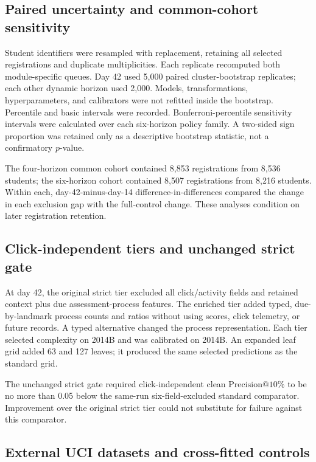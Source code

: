 \documentclass[11pt]{article}
\makeatletter
\newcommand{\Pten}{\ensuremath{\mathrm{Precision}@10\%}}
\makeatother
\begin{document}
\subsection{Paired uncertainty and common-cohort sensitivity}

Student identifiers were resampled with replacement, retaining all selected registrations and duplicate multiplicities. Each replicate recomputed both module-specific queues. Day 42 used 5,000 paired cluster-bootstrap replicates; each other dynamic horizon used 2,000. Models, transformations, hyperparameters, and calibrators were not refitted inside the bootstrap. Percentile and basic intervals were recorded. Bonferroni-percentile sensitivity intervals were calculated over each six-horizon policy family. A two-sided sign proportion was retained only as a descriptive bootstrap statistic, not a confirmatory $p$-value.

The four-horizon common cohort contained 8,853 registrations from 8,536 students; the six-horizon cohort contained 8,507 registrations from 8,216 students. Within each, day-42-minus-day-14 difference-in-differences compared the change in each exclusion gap with the full-control change. These analyses condition on later registration retention.

\subsection{Click-independent tiers and unchanged strict gate}

At day 42, the original strict tier excluded all click/activity fields and retained context plus due assessment-process features. The enriched tier added typed, due-by-landmark process counts and ratios without using scores, click telemetry, or future records. A typed alternative changed the process representation. Each tier selected complexity on 2014B and was calibrated on 2014B. An expanded leaf grid added 63 and 127 leaves; it produced the same selected predictions as the standard grid.

The unchanged strict gate required click-independent clean \Pten{} to be no more than 0.05 below the same-run six-field-excluded standard comparator. Improvement over the original strict tier could not substitute for failure against this comparator.

\subsection{External UCI datasets and cross-fitted controls}
\end{document}
